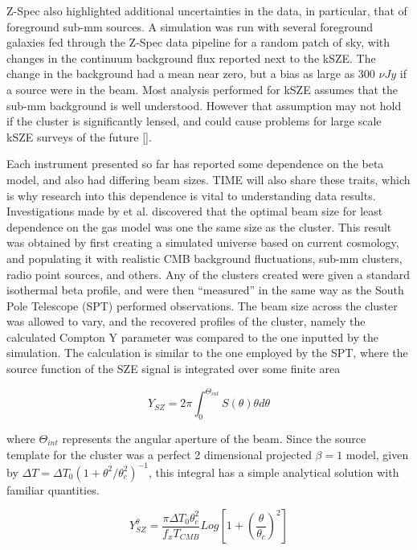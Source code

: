 \documentclass[manuscript]{aastex}
\begin{document}
Z-Spec also highlighted additional uncertainties in the data, in particular, that of foreground sub-mm sources. A simulation was run with several foreground galaxies fed through the Z-Spec data pipeline for a random patch of sky, with changes in the continuum background flux reported next to the kSZE. The change in the background had a mean near zero, but a bias as large as 300 $\nu Jy$ if a source were in the beam. Most analysis performed for kSZE assumes that the sub-mm background is well understood. However that assumption may not hold if the cluster is significantly lensed, and could cause problems for large scale kSZE surveys of the future [\cite{Zemcov2012}].

Each instrument presented so far has reported some dependence on the beta model, and also had differing beam sizes. TIME will also share these traits, which is why research into this dependence is vital to understanding data results. Investigations made by \cite{Saliwanchik2015} et al. discovered that the optimal beam size for least dependence on the gas model was one the same size as the cluster. This result was obtained by first creating a simulated universe based on current cosmology, and populating it with realistic CMB background fluctuations, sub-mm clusters, radio point sources, and others. Any of the clusters created were given a standard isothermal beta profile, and were then ``measured'' in the same way as the South Pole Telescope (SPT) performed observations. The beam size across the cluster was allowed to vary, and the recovered profiles of the cluster, namely the calculated Compton Y parameter was compared to the one inputted by the simulation. The calculation is similar to the one employed by the SPT, where the source function of the SZE signal is integrated over some finite area

\begin{equation}
Y_{SZ} = 2\pi \int_{0}^{\Theta_{int}} S(\theta) \theta d\theta
\end{equation}

where $\Theta_{int}$ represents the angular aperture of the beam. Since the source template for the cluster was a perfect 2 dimensional projected $\beta = 1$ model, given by $\Delta T = \Delta T_{0}(1 + \theta^{2}/\theta_{c}^{2})^{-1}$, this integral has a simple analytical solution with familiar quantities. 

\begin{equation}
Y_{SZ}^{\theta} = \frac{\pi \Delta T_{0} \theta_{c}^{2}}{f_{x} T_{CMB}} Log[1 + (\frac{\theta}{\theta_{c}})^{2}]
\end{equation}
\end{document}
